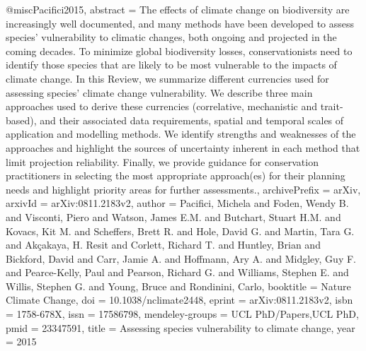 {{@misc{Pacifici2015,
abstract = {The effects of climate change on biodiversity are increasingly well documented, and many methods have been developed to assess species' vulnerability to climatic changes, both ongoing and projected in the coming decades. To minimize global biodiversity losses, conservationists need to identify those species that are likely to be most vulnerable to the impacts of climate change. In this Review, we summarize different currencies used for assessing species' climate change vulnerability. We describe three main approaches used to derive these currencies (correlative, mechanistic and trait-based), and their associated data requirements, spatial and temporal scales of application and modelling methods. We identify strengths and weaknesses of the approaches and highlight the sources of uncertainty inherent in each method that limit projection reliability. Finally, we provide guidance for conservation practitioners in selecting the most appropriate approach(es) for their planning needs and highlight priority areas for further assessments.},
archivePrefix = {arXiv},
arxivId = {arXiv:0811.2183v2},
author = {Pacifici, Michela and Foden, Wendy B. and Visconti, Piero and Watson, James E.M. and Butchart, Stuart H.M. and Kovacs, Kit M. and Scheffers, Brett R. and Hole, David G. and Martin, Tara G. and Ak{\c{c}}akaya, H. Resit and Corlett, Richard T. and Huntley, Brian and Bickford, David and Carr, Jamie A. and Hoffmann, Ary A. and Midgley, Guy F. and Pearce-Kelly, Paul and Pearson, Richard G. and Williams, Stephen E. and Willis, Stephen G. and Young, Bruce and Rondinini, Carlo},
booktitle = {Nature Climate Change},
doi = {10.1038/nclimate2448},
eprint = {arXiv:0811.2183v2},
isbn = {1758-678X},
issn = {17586798},
mendeley-groups = {UCL PhD/Papers,UCL PhD},
pmid = {23347591},
title = {{Assessing species vulnerability to climate change}},
year = {2015}
}

}}

